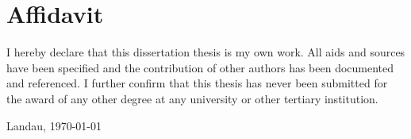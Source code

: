 
\chapter{Affidavit}

I hereby declare that this dissertation thesis is my own work. All aids and sources have been specified and the contribution of other authors has been documented and referenced.
I further confirm that this thesis has never been submitted for the award of any other degree at any university or other tertiary institution.

\vspace{6em}

\noindent Landau, \today